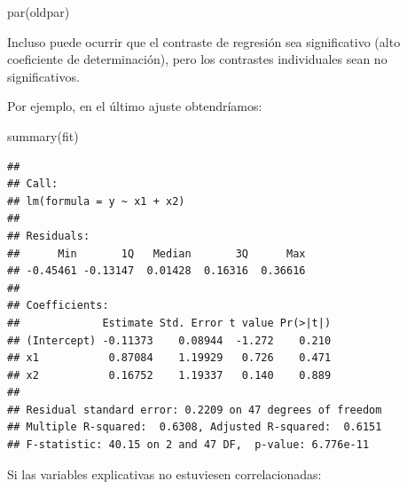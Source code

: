 \documentclass[
  spanish,
]{book}
\newenvironment{Shaded}{\begin{snugshade}}{\end{snugshade}}
\newcommand{\FunctionTok}[1]{\textcolor[rgb]{0.00,0.00,0.00}{#1}}
\newcommand{\NormalTok}[1]{#1}
\theoremstyle{break}
\theoremstyle{definition}
\theoremstyle{definition}
\theoremstyle{definition}
\theoremstyle{definition}
\theoremstyle{remark}
\begin{document}
\begin{Shaded}
\begin{Highlighting}[]
\FunctionTok{par}\NormalTok{(oldpar)}
\end{Highlighting}
\end{Shaded}

Incluso puede ocurrir que el contraste de regresión sea significativo (alto coeficiente de determinación), pero los contrastes individuales sean no significativos.

Por ejemplo, en el último ajuste obtendríamos:

\begin{Shaded}
\begin{Highlighting}[]
\FunctionTok{summary}\NormalTok{(fit)}
\end{Highlighting}
\end{Shaded}

\begin{verbatim}
## 
## Call:
## lm(formula = y ~ x1 + x2)
## 
## Residuals:
##      Min       1Q   Median       3Q      Max 
## -0.45461 -0.13147  0.01428  0.16316  0.36616 
## 
## Coefficients:
##             Estimate Std. Error t value Pr(>|t|)
## (Intercept) -0.11373    0.08944  -1.272    0.210
## x1           0.87084    1.19929   0.726    0.471
## x2           0.16752    1.19337   0.140    0.889
## 
## Residual standard error: 0.2209 on 47 degrees of freedom
## Multiple R-squared:  0.6308, Adjusted R-squared:  0.6151 
## F-statistic: 40.15 on 2 and 47 DF,  p-value: 6.776e-11
\end{verbatim}

Si las variables explicativas no estuviesen correlacionadas:
\end{document}
